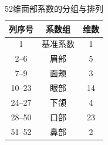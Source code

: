 \begin{table}[htbp]
\centering
\caption{52维面部系数的分组与排列}\label{tab:appendix-video-dimensions}
\begin{tabular*}{\linewidth}{@{\extracolsep{\fill}}ccc@{}}
\toprule
列序号 & 系数组 & 维数 \\
\midrule
1 & 基准系数 & 1 \\
2--6 & 眉部 & 5 \\
7--9 & 面颊 & 3 \\
10--23 & 眼部 & 14 \\
24--27 & 下颌 & 4 \\
28--50 & 口部 & 23 \\
51--52 & 鼻部 & 2 \\
\bottomrule
\end{tabular*}
\end{table}
